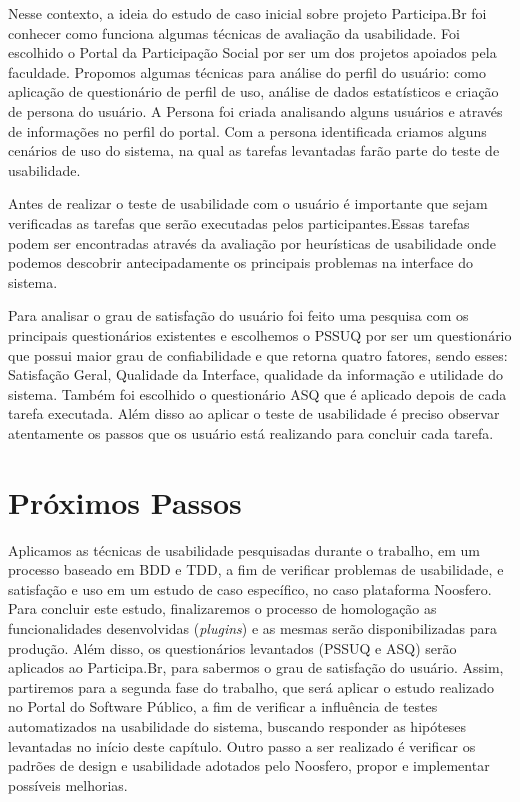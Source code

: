 
Nesse contexto, a ideia do estudo de caso inicial sobre projeto Participa.Br foi conhecer como funciona algumas técnicas de avaliação da usabilidade. Foi escolhido o Portal da Participação Social por ser um dos projetos apoiados pela faculdade.
%
Propomos algumas técnicas para análise do perfil do usuário: como aplicação de questionário de perfil de uso, análise de dados estatísticos e criação de persona do usuário.
%
A Persona foi criada analisando alguns usuários e através de informações no perfil do portal.
%
Com a persona identificada criamos alguns cenários de uso do sistema, na qual as tarefas levantadas farão parte do teste de usabilidade.

Antes de realizar o teste de usabilidade com o usuário é importante que sejam verificadas as tarefas que serão executadas pelos participantes.Essas tarefas podem ser encontradas através da avaliação por heurísticas de usabilidade onde podemos descobrir antecipadamente os principais problemas na interface do sistema.

Para analisar o grau de satisfação do usuário foi feito uma pesquisa com os principais questionários existentes e escolhemos o PSSUQ por ser um questionário que possui maior grau de confiabilidade e que retorna quatro fatores, sendo esses: Satisfação Geral, Qualidade da Interface, qualidade da informação e utilidade do sistema.
%
Também foi escolhido o questionário ASQ que é aplicado depois de cada tarefa executada. Além disso ao aplicar o teste de usabilidade é preciso observar atentamente os passos que os usuário está realizando para concluir cada tarefa.


\section{Próximos Passos}

Aplicamos as técnicas de usabilidade pesquisadas durante o trabalho, em um processo baseado em BDD e TDD, a fim de verificar problemas de usabilidade, e satisfação e uso em um estudo de caso específico, no caso plataforma Noosfero. 
%
Para concluir este estudo, finalizaremos o processo de  homologação as funcionalidades desenvolvidas (\textit{plugins}) e as mesmas serão disponibilizadas para produção.
%
Além disso, os questionários levantados (PSSUQ e ASQ) serão aplicados ao Participa.Br, para sabermos o grau de satisfação do usuário. 
%
Assim, partiremos para a segunda fase do trabalho, que será aplicar o estudo realizado  no Portal do Software Público, a fim de verificar a influência de testes automatizados na usabilidade do sistema, buscando responder as hipóteses levantadas no início deste capítulo. Outro passo a ser realizado é verificar os padrões de design e usabilidade adotados pelo Noosfero, propor e implementar possíveis melhorias.


